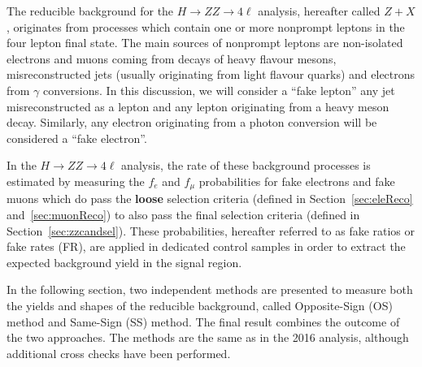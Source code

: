 The reducible background for the $H\to ZZ\to 4\ell $ analysis, hereafter called $Z+X$, originates from processes which contain one or more nonprompt leptons in the four lepton final state. 
The main sources of nonprompt leptons are non-isolated electrons and muons coming from decays of heavy flavour mesons, misreconstructed jets (usually originating from light flavour quarks) and electrons from $\gamma$ conversions. 
In this discussion, we will consider a ``fake lepton'' any jet misreconstructed as a lepton and any lepton originating from a heavy meson decay.
Similarly, any electron originating from a photon conversion will be considered a ``fake electron''.

In the $H\to ZZ\to 4\ell $ analysis, the rate of these background processes is estimated by measuring the $f_{e}$ and $f_{\mu}$ probabilities for fake electrons and fake muons which do pass the {\bf loose} selection criteria (defined in Section~\ref{sec:eleReco} and~\ref{sec:muonReco}) to also pass the final selection criteria (defined in Section~\ref{sec:zzcandsel}).  
These probabilities, hereafter referred to as fake ratios or fake rates (FR), are applied in dedicated control samples in order to extract the expected background yield in the signal region. 

In the following section, two independent methods are presented to measure both the yields and shapes of the reducible background, called Opposite-Sign (OS) method and Same-Sign (SS) method. The final result combines the outcome of the two approaches. The methods are the same as in the 2016 analysis, although additional cross checks have been performed. 
